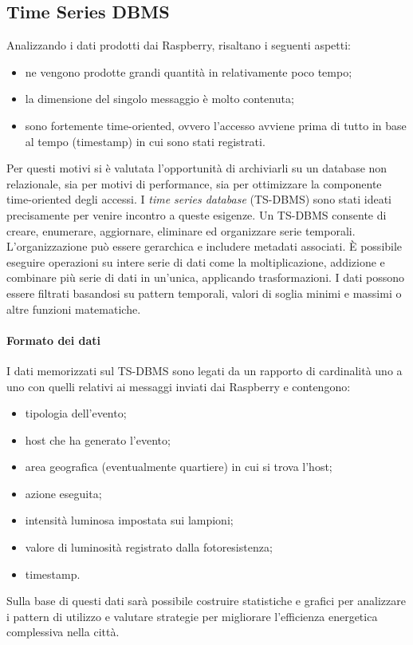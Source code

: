 \subsection{Time Series DBMS}
Analizzando i dati prodotti dai Raspberry, risaltano i seguenti aspetti:
\begin{itemize}
 \item ne vengono prodotte grandi quantità in relativamente poco tempo;
 \item la dimensione del singolo messaggio è molto contenuta;
 \item sono fortemente time-oriented, ovvero l'accesso avviene prima di tutto in base al tempo (timestamp) in cui sono stati registrati.
\end{itemize}
Per questi motivi si è valutata l'opportunità di archiviarli su un database non relazionale, sia per motivi di performance, sia per ottimizzare la componente time-oriented degli accessi.
I \textit{time series database} (TS-DBMS) sono stati ideati precisamente per venire incontro a queste esigenze.
Un TS-DBMS consente di creare, enumerare, aggiornare, eliminare ed organizzare serie temporali.
L'organizzazione può essere gerarchica e includere metadati associati.
È possibile eseguire operazioni su intere serie di dati come la moltiplicazione, addizione e combinare più serie di dati in un'unica, applicando trasformazioni.
I dati possono essere filtrati basandosi su pattern temporali, valori di soglia minimi e massimi o altre funzioni matematiche.
\paragraph{Formato dei dati}
I dati memorizzati sul TS-DBMS sono legati da un rapporto di cardinalità uno a uno con quelli relativi ai messaggi inviati dai Raspberry e contengono:
\begin{itemize}
 \item tipologia dell'evento;
 \item host che ha generato l'evento;
 \item area geografica (eventualmente quartiere) in cui si trova l'host;
 \item azione eseguita;
 \item intensità luminosa impostata sui lampioni;
 \item valore di luminosità registrato dalla fotoresistenza;
 \item timestamp.
\end{itemize}
Sulla base di questi dati sarà possibile costruire statistiche e grafici per analizzare i pattern di utilizzo e valutare strategie per migliorare l'efficienza energetica complessiva nella città.

